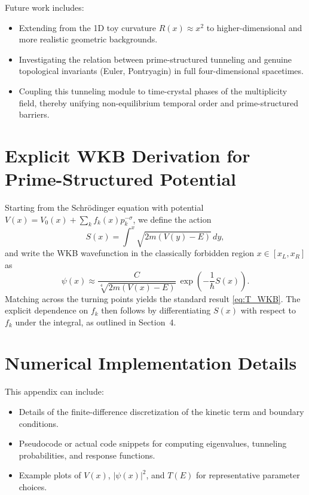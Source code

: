 \documentclass[11pt]{article}
\begin{document}
Future work includes:
\begin{itemize}
  \item Extending from the 1D toy curvature \(R(x)\approx x^2\) to
  higher-dimensional and more realistic geometric backgrounds.
  \item Investigating the relation between prime-structured tunneling
  and genuine topological invariants (Euler, Pontryagin) in full
  four-dimensional spacetimes.
  \item Coupling this tunneling module to time-crystal phases of the
  multiplicity field, thereby unifying non-equilibrium temporal order
  and prime-structured barriers.
\end{itemize}

\appendix

\section{Explicit WKB Derivation for Prime-Structured Potential}
\label{app:wkb}

Starting from the Schr\"odinger equation with potential
\(V(x)=V_0(x)+\sum_k f_k(x)p_k^{-\sigma}\), we define the action
\begin{equation}
  S(x) = \int^x \sqrt{2m\left(V(y)-E\right)}\,dy,
\end{equation}
and write the WKB wavefunction in the classically forbidden region
\(x\in[x_L,x_R]\) as
\begin{equation}
  \psi(x) \approx \frac{C}{\sqrt[4]{2m\left(V(x)-E\right)}}\,
  \exp\left(-\frac{1}{\hbar}S(x)\right).
\end{equation}
Matching across the turning points yields the standard result
\eqref{eq:T_WKB}. The explicit dependence on \(f_k\) then follows by
differentiating \(S(x)\) with respect to \(f_k\) under the integral, as
outlined in Section~4.

\section{Numerical Implementation Details}
\label{app:numerics}

This appendix can include:
\begin{itemize}
  \item Details of the finite-difference discretization of the kinetic
  term and boundary conditions.
  \item Pseudocode or actual code snippets for computing eigenvalues,
  tunneling probabilities, and response functions.
  \item Example plots of \(V(x)\), \(|\psi(x)|^2\), and
  \(T(E)\) for representative parameter choices.
\end{itemize}
\end{document}
